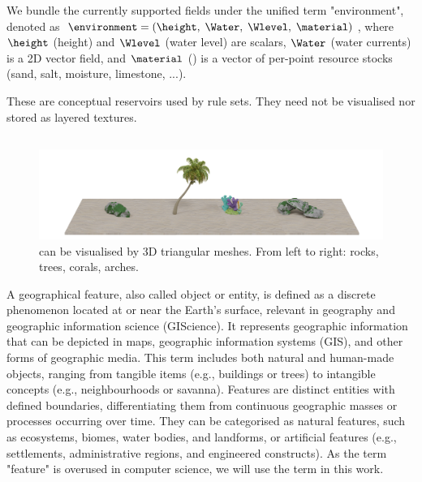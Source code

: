 We bundle the currently supported fields under the unified term "environment", denoted as $\environment = (\height, \; \Water, \; \Wlevel, \; \material)$,
where $\height$ (height) and $\Wlevel$ (water level) are scalars, $\Water$ (water currents) is a 2D vector field, and $\material$ () is a vector of per-point resource stocks (sand, salt, moisture, limestone, ...).

These  are conceptual reservoirs used by rule sets. They need not be visualised nor stored as layered textures.

\subsection{}
\label{sec:env-obj-environmental-objects}

\begin{figure}
    \includegraphics{assets-demo.pdf}
    \caption{ can be visualised by 3D triangular meshes. From left to right: rocks, trees, corals, arches.}
    \label{fig:env-obj-assets}
\end{figure}

A geographical feature, also called object or entity, is defined as a discrete phenomenon located at or near the Earth's surface, relevant in geography and geographic information science (GIScience). It represents geographic information that can be depicted in maps, geographic information systems (GIS), and other forms of geographic media. This term includes both natural and human-made objects, ranging from tangible items (e.g., buildings or trees) to intangible concepts (e.g., neighbourhoods or savanna). Features are distinct entities with defined boundaries, differentiating them from continuous geographic masses or processes occurring over time. They can be categorised as natural features, such as ecosystems, biomes, water bodies, and landforms, or artificial features (e.g., settlements, administrative regions, and engineered constructs). As the term "feature" is overused in computer science, we will use the term  in this work.


